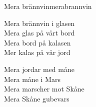 \begin{song}{Mera brännvin}{merabrannvin}
\begin{vers}
Mera brännvin i glasen\\
Mera glas på vårt bord\\
Mera bord på kalasen\\
Mer kalas på vår jord\\
\end{vers}
\begin{vers}
Mera jordar med måne\\
Mera måne i Mars\\
Mera marscher mot Skåne\\
Mera Skåne gubevars\\
\end{vers}
\end{song}
